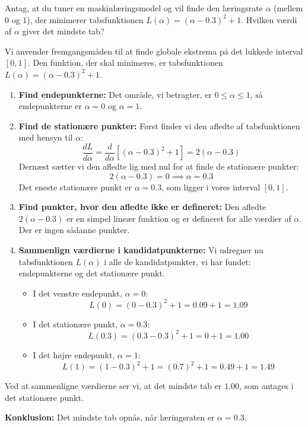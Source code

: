 \begin{example}

    Antag, at du tuner en maskinlæringsmodel og vil finde den læringsrate \( \alpha \) (mellem \(0\) og \(1\)), der minimerer tabsfunktionen \( L(\alpha) = (\alpha - 0.3)^2 + 1 \). Hvilken værdi af \( \alpha \) giver det mindste tab?
    \end{example}
    
    \begin{solution} Vi anvender fremgangsmåden til at finde globale ekstrema på det lukkede interval \( [0, 1] \). Den funktion, der skal minimeres, er tabsfunktionen \( L(\alpha) = (\alpha - 0.3)^2 + 1 \).
    
    \begin{enumerate}
        \item \textbf{Find endepunkterne:} Det område, vi betragter, er \( 0 \le \alpha \le 1 \), så endepunkterne er \( \alpha = 0 \) og \( \alpha = 1 \).
    
        \item \textbf{Find de stationære punkter:} Først finder vi den afledte af tabsfunktionen med hensyn til \( \alpha \):
        \[
        \frac{dL}{d\alpha} = \frac{d}{d\alpha} \left[ (\alpha - 0.3)^2 + 1 \right] = 2(\alpha - 0.3)
        \]
        Dernæst sætter vi den afledte lig med nul for at finde de stationære punkter:
        \[
        2(\alpha - 0.3) = 0 \implies \alpha = 0.3
        \]
        Det eneste stationære punkt er \( \alpha = 0.3 \), som ligger i vores interval \( [0, 1] \).
    
        \item \textbf{Find punkter, hvor den afledte ikke er defineret:} Den afledte \( 2(\alpha - 0.3) \) er en simpel lineær funktion og er defineret for alle værdier af \( \alpha \). Der er ingen sådanne punkter.
    
        \item \textbf{Sammenlign værdierne i kandidatpunkterne:} Vi udregner nu tabsfunktionen \( L(\alpha) \) i alle de kandidatpunkter, vi har fundet: endepunkterne og det stationære punkt.
        \begin{itemize}
            \item I det venstre endepunkt, \( \alpha = 0 \):
            \[ L(0) = (0 - 0.3)^2 + 1 = 0.09 + 1 = 1.09 \]
            \item I det stationære punkt, \( \alpha = 0.3 \):
            \[ L(0.3) = (0.3 - 0.3)^2 + 1 = 0 + 1 = 1.00 \]
            \item I det højre endepunkt, \( \alpha = 1 \):
            \[ L(1) = (1 - 0.3)^2 + 1 = (0.7)^2 + 1 = 0.49 + 1 = 1.49 \]
        \end{itemize}
    \end{enumerate}
    
    Ved at sammenligne værdierne ser vi, at det mindste tab er \( 1.00 \), som antages i det stationære punkt.
    
    \textbf{Konklusion:} Det mindste tab opnås, når læringsraten er \( \alpha = 0.3 \).
    \end{solution}

